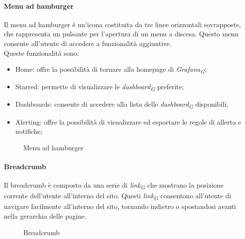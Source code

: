 \paragraph{Menu ad hamburger}
Il menu ad hamburger è un'icona costituita da tre linee orizzontali sovrapposte, che rappresenta un pulsante per l'apertura di un menu a discesa. Questo menu consente all'utente di accedere a funzionalità aggiuntive. \\
Queste funzionalità sono:
\begin{itemize}
    \item Home: offre la possibilità di tornare alla homepage di \textit{Grafana}\textsubscript{\textit{G}};
    \item Starred: permette di visualizzare le \textit{dashboard}\textsubscript{\textit{G}} preferite;
    \item Dashboards: consente di accedere alla lista delle \textit{dashboard}\textsubscript{\textit{G}} disponibili;
    \item Alerting: offre la possibilità di visualizzare ed esportare le regole di allerta e notifiche;
\end{itemize}
\begin{figure}[H]
    \centering
    \caption{Menu ad hamburger}
    \label{fig:my_label}
\end{figure}

\paragraph{Breadcrumb}
Il breadcrumb è composto da una serie di \textit{link}\textsubscript{\textit{G}} che mostrano la posizione corrente dell'utente all'interno del sito. Questi \textit{link}\textsubscript{\textit{G}} consentono all'utente di navigare facilmente all'interno del sito, tornando indietro o spostandosi avanti nella gerarchia delle pagine. \\
\begin{figure}[H]
    \centering
    \caption{Breadcrumb}
    \label{fig:my_label}
\end{figure} 

